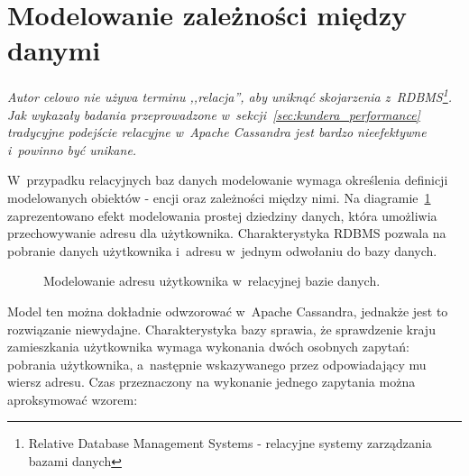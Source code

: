 \section{Modelowanie zależności między danymi}

\emph{Autor celowo nie używa terminu ,,relacja'', aby uniknąć skojarzenia z~RDBMS\footnote{Relative Database Management Systems - relacyjne systemy zarządzania bazami danych}. Jak wykazały badania przeprowadzone w~sekcji~\ref{sec:kundera_performance} tradycyjne podejście relacyjne w~Apache Cassandra jest bardzo nieefektywne i~powinno być unikane.}

W~przypadku relacyjnych baz danych modelowanie wymaga określenia definicji modelowanych obiektów - encji oraz zależności między nimi. Na diagramie~\ref{fig:er_user_address} zaprezentowano efekt modelowania prostej dziedziny danych, która umożliwia przechowywanie adresu dla użytkownika. Charakterystyka RDBMS pozwala na pobranie danych użytkownika i~adresu w~jednym odwołaniu do bazy danych.

\begin{figure}[ht!]
	\centering

	\caption{Modelowanie adresu użytkownika w~relacyjnej bazie danych.}
	\label{fig:er_user_address}
\end{figure}

Model ten można dokładnie odwzorować w~Apache Cassandra, jednakże jest to rozwiązanie niewydajne. Charakterystyka bazy sprawia, że sprawdzenie kraju zamieszkania użytkownika wymaga wykonania dwóch osobnych zapytań: pobrania użytkownika, a~następnie wskazywanego przez odpowiadający mu wiersz adresu. Czas przeznaczony na wykonanie jednego zapytania można aproksymować wzorem:

